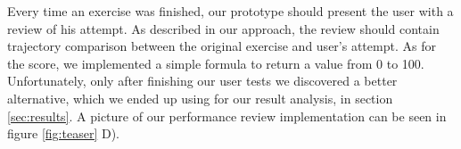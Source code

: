 Every time an exercise was finished, our prototype should present the user with a review of his attempt. 
As described in our approach, the review should contain trajectory comparison between the original exercise and user's attempt.
As for the score, we implemented a simple formula to return a value from 0 to 100. 
Unfortunately, only after finishing our user tests we discovered a better alternative, which we ended up using for our result analysis, in section \ref{sec:results}.
A picture of our performance review implementation can be seen in figure \ref{fig:teaser} D). 

